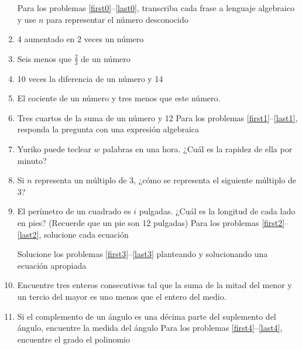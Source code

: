 \documentclass[10pt,twoside]{article}
\begin{document}
\begin{enumerate}
Para los problemas \ref{first0}--\ref{last0}, transcriba cada frase a lenguaje algebraico y use $n$ para representar el número desconocido
\item 4 aumentado en 2 veces un número\label{first0}
\item Seis menos que $\frac{2}{3}$ de un número
\item 10 veces la diferencia de un número y 14
\item El cociente de un número y tres menos que este número.
\item Tres cuartos de la suma de un número y 12\label{last0}
Para los problemas \ref{first1}--\ref{last1}, responda la pregunta con una expresión algebraica
\item Yuriko puede teclear $w$ palabras en una hora. ¿Cuál es la rapidez de ella por minuto?
\item Si $n$ representa un múltiplo de 3, ¿c\'{o}mo se representa el siguiente m\'{u}ltiplo de 3?
\item El per\'{i}metro de un cuadrado es $i$ pulgadas. ¿Cu\'{a}l es la longitud de cada lado en pies? (Recuerde que un pie son 12 pulgadas)
Para los problemas \ref{first2}--\ref{last2}, solucione cada ecuación
Solucione los problemas \ref{first3}--\ref{last3} planteando y solucionando una ecuación apropiada
\item Encuentre tres enteros consecutivos tal que la suma de la mitad del menor y un tercio del mayor es uno menos que el entero del medio.\label{first3}
\item Si el complemento de un ángulo es una d\'{e}cima parte del suplemento del \'{a}ngulo, encuentre la medida del \'{a}ngulo\label{last3}
Para los problemas \ref{first4}--\ref{last4}, encuentre el grado el polinomio
\end{enumerate}
\end{document}

